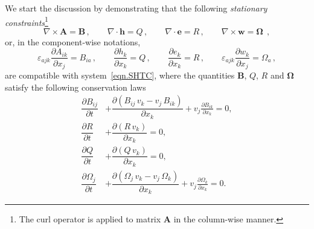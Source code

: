 \documentclass[twoside]{article}
\newcommand{\AAA}{{\boldsymbol{A}}}
\newcommand{\ww}{{\boldsymbol{w}}}
\newcommand{\ee}{{\boldsymbol{e}}}
\newcommand{\hh}{{\boldsymbol{h}}}
\newcommand{\BB}{{\boldsymbol{B}}}
\newcommand{\pd}{\partial}
\begin{document}
We start the discussion by demonstrating that the following 
\textit{stationary 
constraints}\footnote{The curl 
operator is applied to matrix $ \AAA $ in the column-wise manner.}
\begin{equation}\label{eqn.constr.vec}
\nabla\times\AAA = \BB\,,\qquad 
\nabla \cdot \hh = Q\,, \qquad 
\nabla\cdot\ee = R\,, \qquad 
\nabla\times\ww = \bm{\Omega}\ \ ,
\end{equation}
or, in the component-wise notations,
\begin{equation}\label{eqn.constr.comp}
\varepsilon_{ajk}\frac{\pd A_{ik}}{\pd x_j} = B_{ia}\,, \qquad \dfrac{\pd 
h_k}{\pd 
x_k} = Q\,,\qquad \dfrac{\pd 
e_k}{\pd x_k} = R\,,  
\qquad \varepsilon_{ajk}\frac{\pd w_k}{\pd x_j} = \Omega_a \, ,
\end{equation}
are compatible with system~\eqref{eqn.SHTC}, where the quantities $ \BB $, $ Q 
$, $ R $ and $ \bm{\Omega} $ satisfy the following conservation laws
\begin{subequations}\label{eqn.invol.constr.quantities}
	\begin{align}
	\dfrac{\pd B_{ij}}{\pd t} & + \dfrac{\pd (B_{ij}\, v_k - v_j\, 
			B_{ik})}{\pd x_k}  + v_j \frac{\pd B_{ik}}{\pd x_k}
			= 
			0, 
			\label{eqn.invol.constr.B}\\[2mm]
	\dfrac{\pd R}{\pd t} & + \dfrac{\pd (R\,v_k)}{\pd x_k} = 0, 
	\label{eqn.invol.constr.R}\\[2mm]
	\dfrac{\pd Q}{\pd t} & + \dfrac{\pd (Q\,v_k)}{\pd x_k} = 0, 
	\label{eqn.invol.constr.Q}\\[2mm]
	\dfrac{\pd \Omega_j}{\pd t} & + \dfrac{\pd (\Omega_j\, v_k - v_j\, 
		\Omega_k)}{\pd x_k} + v_j \frac{\pd \Omega_k}{\pd x_k} = 
		0. 
		\label{eqn.invol.constr.O}
	\end{align}
\end{subequations}
\end{document}
